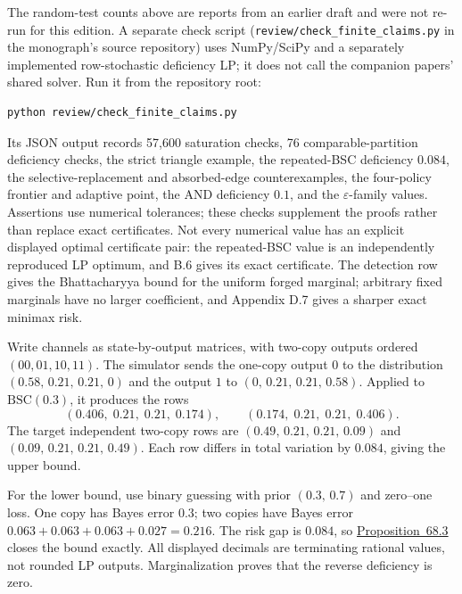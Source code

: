 
The random-test counts above are reports from an earlier draft and were not re-run for this edition. A separate check script (\texttt{review/check\_finite\_claims.py} in the monograph's source repository) uses NumPy/SciPy and a separately implemented row-stochastic deficiency LP; it does not call the companion papers' shared solver. Run it from the repository root:

\begin{verbatim}
python review/check_finite_claims.py
\end{verbatim}

Its JSON output records 57,600 saturation checks, 76 comparable-partition deficiency checks, the strict triangle example, the repeated-BSC deficiency \(0.084\), the selective-replacement and absorbed-edge counterexamples, the four-policy frontier and adaptive point, the AND deficiency \(0.1\), and the \(\varepsilon\)-family values. Assertions use numerical tolerances; these checks supplement the proofs rather than replace exact certificates. Not every numerical value has an explicit displayed optimal certificate pair: the repeated-BSC value is an independently reproduced LP optimum, and B.6 gives its exact certificate. The detection row gives the Bhattacharyya bound for the uniform forged marginal; arbitrary fixed marginals have no larger coefficient, and Appendix D.7 gives a sharper exact minimax risk.


Write channels as state-by-output matrices, with two-copy outputs ordered \((00, 01, 10, 11)\). The simulator sends the one-copy output \(0\) to the distribution \((0.58,\, 0.21,\, 0.21,\, 0)\) and the output \(1\) to \((0,\, 0.21,\, 0.21,\, 0.58)\). Applied to \(\mathrm{BSC}(0.3)\), it produces the rows
\[
(0.406,\; 0.21,\; 0.21,\; 0.174), \qquad (0.174,\; 0.21,\; 0.21,\; 0.406).
\]
The target independent two-copy rows are \((0.49,\, 0.21,\, 0.21,\, 0.09)\) and \((0.09,\, 0.21,\, 0.21,\, 0.49)\). Each row differs in total variation by \(0.084\), giving the upper bound.

For the lower bound, use binary guessing with prior \((0.3,\, 0.7)\) and zero--one loss. One copy has Bayes error \(0.3\); two copies have Bayes error \(0.063 + 0.063 + 0.063 + 0.027 = 0.216\). The risk gap is \(0.084\), so \hyperlink{stmt:68.3}{Proposition~68.3} closes the bound exactly. All displayed decimals are terminating rational values, not rounded LP outputs. Marginalization proves that the reverse deficiency is zero.

